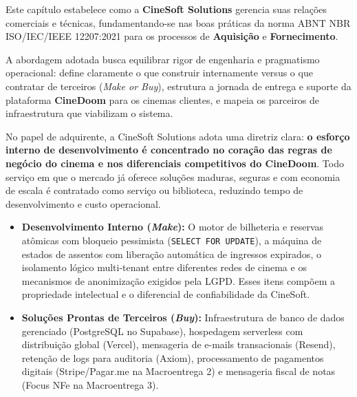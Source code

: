 

Este capítulo estabelece como a \textbf{CineSoft Solutions} gerencia suas relações comerciais e técnicas, fundamentando-se nas boas práticas da norma ABNT NBR ISO/IEC/IEEE 12207:2021 para os processos de \textbf{Aquisição} e \textbf{Fornecimento}.

A abordagem adotada busca equilibrar rigor de engenharia e pragmatismo operacional: define claramente o que construir internamente versus o que contratar de terceiros (\emph{Make or Buy}), estrutura a jornada de entrega e suporte da plataforma \textbf{CineDoom} para os cinemas clientes, e mapeia os parceiros de infraestrutura que viabilizam o sistema.


No papel de adquirente, a CineSoft Solutions adota uma diretriz clara: \textbf{o esforço interno de desenvolvimento é concentrado no coração das regras de negócio do cinema e nos diferenciais competitivos do CineDoom}. Todo serviço em que o mercado já oferece soluções maduras, seguras e com economia de escala é contratado como serviço ou biblioteca, reduzindo tempo de desenvolvimento e custo operacional.


\begin{itemize}
\item \textbf{Desenvolvimento Interno (\emph{Make}):} O motor de bilheteria e reservas atômicas com bloqueio pessimista (\texttt{SELECT \allowbreak\hspace{0pt plus 1pt}FOR \allowbreak\hspace{0pt plus 1pt}UPDATE}), a máquina de estados de assentos com liberação automática de ingressos expirados, o isolamento lógico multi-tenant entre diferentes redes de cinema e os mecanismos de anonimização exigidos pela LGPD. Esses itens compõem a propriedade intelectual e o diferencial de confiabilidade da CineSoft.
\item \textbf{Soluções Prontas de Terceiros (\emph{Buy}):} Infraestrutura de banco de dados gerenciado (PostgreSQL no Supabase), hospedagem serverless com distribuição global (Vercel), mensageria de e-mails transacionais (Resend), retenção de logs para auditoria (Axiom), processamento de pagamentos digitais (Stripe/Pagar.me na Macroentrega 2) e mensageria fiscal de notas (Focus NFe na Macroentrega 3).
\end{itemize}

